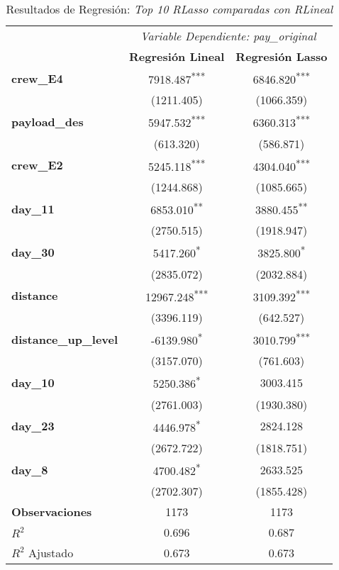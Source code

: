 \documentclass{article}
\begin{document}
\begin{table}[h!]
\centering
\caption{Resultados de Regresión: \textit {Top 10 RLasso comparadas con RLineal}}
\begin{threeparttable}
\begin{tabular}{@{}lcc@{}}
\toprule
 & \multicolumn{2}{c}{\textit{Variable Dependiente: pay\_original}} \\
\cmidrule(lr){2-3}
 & \textbf{Regresión Lineal} & \textbf{Regresión Lasso} \\
\midrule
\textbf{crew\_E4} & 7918.487\textsuperscript{***} & 6846.820\textsuperscript{***} \\
 & (1211.405) & (1066.359) \\
\textbf{payload\_des} & 5947.532\textsuperscript{***} & 6360.313\textsuperscript{***} \\
 & (613.320) & (586.871) \\
\textbf{crew\_E2} & 5245.118\textsuperscript{***} & 4304.040\textsuperscript{***} \\
 & (1244.868) & (1085.665) \\
\textbf{day\_11} & 6853.010\textsuperscript{**} & 3880.455\textsuperscript{**} \\
 & (2750.515) & (1918.947) \\
\textbf{day\_30} & 5417.260\textsuperscript{*} & 3825.800\textsuperscript{*} \\
 & (2835.072) & (2032.884) \\
\textbf{distance} & 12967.248\textsuperscript{***} & 3109.392\textsuperscript{***} \\
 & (3396.119) & (642.527) \\
\textbf{distance\_up\_level} & -6139.980\textsuperscript{*} & 3010.799\textsuperscript{***} \\
 & (3157.070) & (761.603) \\
\textbf{day\_10} & 5250.386\textsuperscript{*} & 3003.415 \\
 & (2761.003) & (1930.380) \\
\textbf{day\_23} & 4446.978\textsuperscript{*} & 2824.128 \\
 & (2672.722) & (1818.751) \\
\textbf{day\_8} & 4700.482\textsuperscript{*} & 2633.525 \\
 & (2702.307) & (1855.428) \\
\midrule
\textbf{Observaciones} & 1173 & 1173 \\
$R^{2}$ & 0.696 & 0.687 \\
$R^{2}$ Ajustado & 0.673 & 0.673 \\

\end{tabular}
\end{threeparttable}
\end{table}
\end{document}
